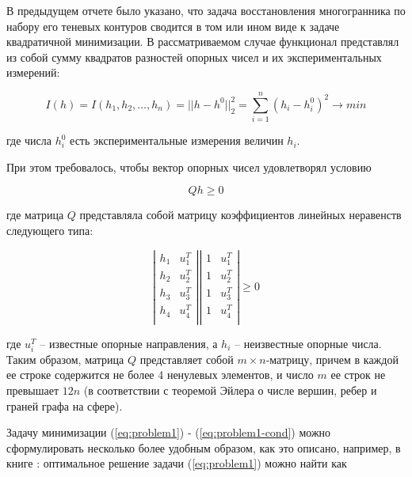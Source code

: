 \documentclass[a4paper, 12pt, titlepage]{article}
\theoremstyle{definition}
\theoremstyle{plain}
\theoremstyle{plain}
\begin{document}
В предыдущем отчете было указано, что задача восстановления многогранника по 
набору его теневых контуров сводится в том или ином виде к задаче квадратичной 
минимизации. В рассматриваемом случае функционал представлял из собой сумму 
квадратов разностей опорных чисел и их экспериментальных измерений:

\begin{equation}
\label{eq:problem1}
 I(h) = I(h_{1}, h_{2}, \ldots, h_{n}) = ||h - h^{0}||_{2}^{2} =
 \sum \limits_{i = 1}^{n} (h_{i} - h_{i}^{0})^{2} \to min
\end{equation}

где числа $h_{i}^{0}$ есть экспериментальные измерения величин $h_{i}$.

При этом требовалось, чтобы вектор опорных чисел удовлетворял условию

\begin{equation}
\label{eq:problem1-cond}
 Q h \geq 0
\end{equation}

где матрица $Q$ представляла собой матрицу коэффициентов линейных неравенств
следующего типа:

\begin{equation}
\left|\begin{array}{cc}
  h_{1} & u_{1}^{T} \\
  h_{2} & u_{2}^{T} \\
  h_{3} & u_{3}^{T} \\
  h_{4} & u_{4}^{T} \\
\end{array}\right|
  \left|\begin{array}{cc}
  1 & u_{1}^{T} \\
  1 & u_{2}^{T} \\
  1 & u_{3}^{T} \\
  1 & u_{4}^{T} \\
\end{array}\right|
\geq 0
\end{equation}

где $u_{i}^{T}$ -- известные опорные направления, а $h_{i}$ -- неизвестные
опорные числа. Таким образом, матрица $Q$ представляет собой $m \times
n$-матрицу, причем в каждой ее строке содержится не более 4 ненулевых элементов,
и число $m$ ее строк не превышает $12 n$ (в соответствии с теоремой Эйлера о
числе вершин, ребер и граней графа на сфере).

Задачу минимизации (\ref{eq:problem1}) - (\ref{eq:problem1-cond}) можно 
сформулировать несколько более удобным образом, как это описано, например, в 
книге \cite{BertsekasTsitsiklis1989}: оптимальное решение задачи
(\ref{eq:problem1}) можно найти как
\end{document}
